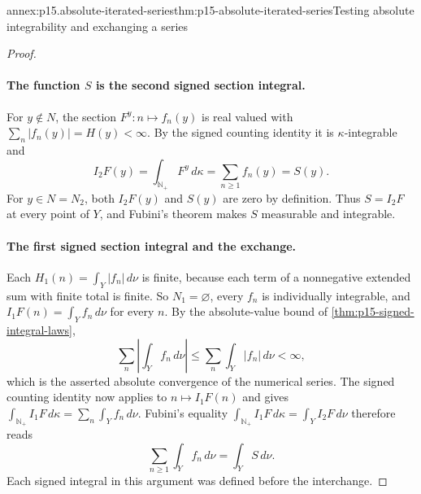 \begin{annexitem}{annex:p15.absolute-iterated-series}{thm:p15-absolute-iterated-series}{Testing absolute integrability and exchanging a series}
\begin{proof}
\paragraph{The function \(S\) is the second signed section integral.}
For \(y\notin N\), the section \(F^y:n\mapsto f_n(y)\) is real valued
with \(\sum_n|f_n(y)|=H(y)<\infty\). By the signed counting identity it
is \(\kappa\)-integrable and
\[
 I_2F(y)=\int_{\mathbb N_+}F^y\,d\kappa=\sum_{n\geq1}f_n(y)=S(y).
\]
For \(y\in N=N_2\), both \(I_2F(y)\) and \(S(y)\) are zero by
definition. Thus \(S=I_2F\) at every point of \(Y\), and Fubini's
theorem makes \(S\) measurable and integrable.

\paragraph{The first signed section integral and the exchange.}
Each \(H_1(n)=\int_Y|f_n|\,d\nu\) is finite, because each term of a
nonnegative extended sum with finite total is finite. So
\(N_1=\varnothing\), every \(f_n\) is individually integrable, and
\(I_1F(n)=\int_Yf_n\,d\nu\) for every \(n\). By the absolute-value
bound of \cref{thm:p15-signed-integral-laws},
\[
 \sum_n\left|\int_Yf_n\,d\nu\right|
       \leq\sum_n\int_Y|f_n|\,d\nu<\infty,
\]
which is the asserted absolute convergence of the numerical series.
The signed counting identity now applies to \(n\mapsto I_1F(n)\) and
gives \(\int_{\mathbb N_+}I_1F\,d\kappa=\sum_n\int_Yf_n\,d\nu\).
Fubini's equality
\(\int_{\mathbb N_+}I_1F\,d\kappa=\int_YI_2F\,d\nu\) therefore reads
\[
 \sum_{n\geq1}\int_Yf_n\,d\nu=\int_YS\,d\nu .
\]
Each signed integral in this argument was defined before the interchange.
\end{proof}
\end{annexitem}


